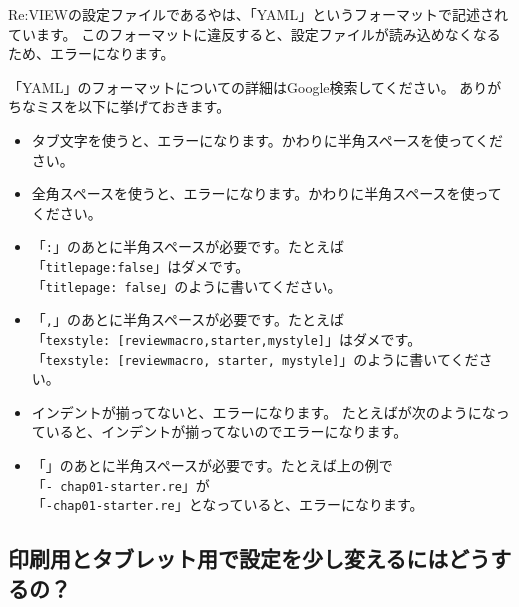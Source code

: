 Re:VIEWの設定ファイルであるやは、「YAML」というフォーマットで記述されています。
このフォーマットに違反すると、設定ファイルが読み込めなくなるため、エラーになります。

「YAML」のフォーマットについての詳細はGoogle検索してください。
ありがちなミスを以下に挙げておきます。

\begin{itemize}
\item タブ文字を使うと、エラーになります。かわりに半角スペースを使ってください。
\item 全角スペースを使うと、エラーになります。かわりに半角スペースを使ってください。
\item 「\texttt{:}」のあとに半角スペースが必要です。たとえば\\
「\texttt{titlepage:false}」はダメです。\\
「\texttt{titlepage: false}」のように書いてください。
\item 「\texttt{,}」のあとに半角スペースが必要です。たとえば\\
「\texttt{texstyle: [reviewmacro,starter,mystyle]}」はダメです。\\
「\texttt{texstyle: [reviewmacro, starter, mystyle]}」のように書いてください。
\item インデントが揃ってないと、エラーになります。
   たとえばが次のようになっていると、インデントが揃ってないのでエラーになります。
\end{itemize}

\label{}
\begin{starterprogram}\end{starterprogram}

\begin{itemize}
\item 「\reviewem{{-}}」のあとに半角スペースが必要です。たとえば上の例で\\
「\texttt{{-} chap01{-}starter.re}」が\\
「\texttt{{-}chap01{-}starter.re}」となっていると、エラーになります。
\end{itemize}

\subsection{印刷用とタブレット用で設定を少し変えるにはどうするの？}
\label{sec:2-7-2}

